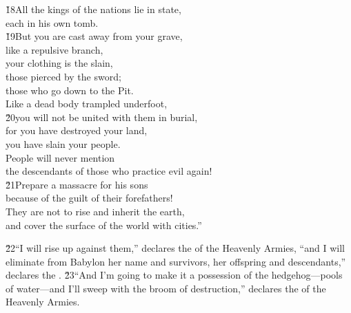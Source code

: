 \begin{poetry}
\poeml \v{18}All the kings of the nations lie in state, \\
\poemll    each in his own tomb. \\
\poeml \v{19}But you are cast away from your grave, \\
\poemll    like a repulsive branch, \\
\poeml your clothing is the slain, \\
\poemll    those pierced by the sword; \\
\poemlll       those who go down to the Pit. \\
\poeml Like a dead body trampled underfoot, \\
\poeml \v{20}you will not be united with them in burial, \\
\poeml for you have destroyed your land, \\
\poemll    you have slain your people. \\
\poeml People will never mention \\
\poemll    the descendants of those who practice evil again! \\
\poeml \v{21}Prepare a massacre for his sons \\
\poemll    because of the guilt of their forefathers! \\
\poeml They are not to rise and inherit the earth, \\
\poemll    and cover the surface of the world with cities.''
\end{poetry}

\v{22}``I will rise up against them,'' declares the  of the Heavenly Armies, ``and I will eliminate from Babylon her name and survivors, her offspring and descendants,'' declares the . \v{23}``And I'm going to make it a possession of the hedgehog---pools of water---and I'll sweep with the broom of destruction,'' declares the  of the Heavenly Armies.


